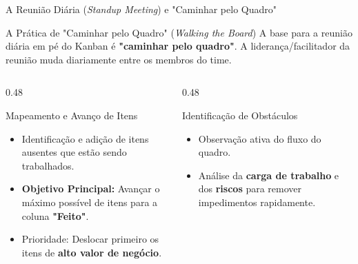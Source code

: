 \documentclass[aspectratio=169, 9pt]{beamer}
\begin{document}
\begin{frame}{A Reunião Diária (\textit{Standup Meeting}) e "Caminhar pelo Quadro"}
  \begin{block}{A Prática de "Caminhar pelo Quadro" (\textit{Walking the Board})}
    A base para a reunião diária em pé do Kanban é \textbf{"caminhar pelo quadro"}. A liderança/facilitador da reunião muda diariamente entre os membros do time.
  \end{block}

  \vspace{0.2cm}

  \begin{columns}[T]
    \begin{column}{0.48\textwidth}
      \begin{exampleblock}{Mapeamento e Avanço de Itens}
        \begin{itemize}
          \item Identificação e adição de itens ausentes que estão sendo trabalhados.
          \item \textbf{Objetivo Principal:} Avançar o máximo possível de itens para a coluna \textbf{"Feito"}.
          \item Prioridade: Deslocar primeiro os itens de \textbf{alto valor de negócio}.
        \end{itemize}
      \end{exampleblock}
    \end{column}

    \begin{column}{0.48\textwidth}
      \begin{alertblock}{Identificação de Obstáculos}
        \begin{itemize}
          \item Observação ativa do fluxo do quadro.
          \item Análise da \textbf{carga de trabalho} e dos \textbf{riscos} para remover impedimentos rapidamente.
        \end{itemize}
      \end{alertblock}
    \end{column}
  \end{columns}
\end{frame}
\end{document}
